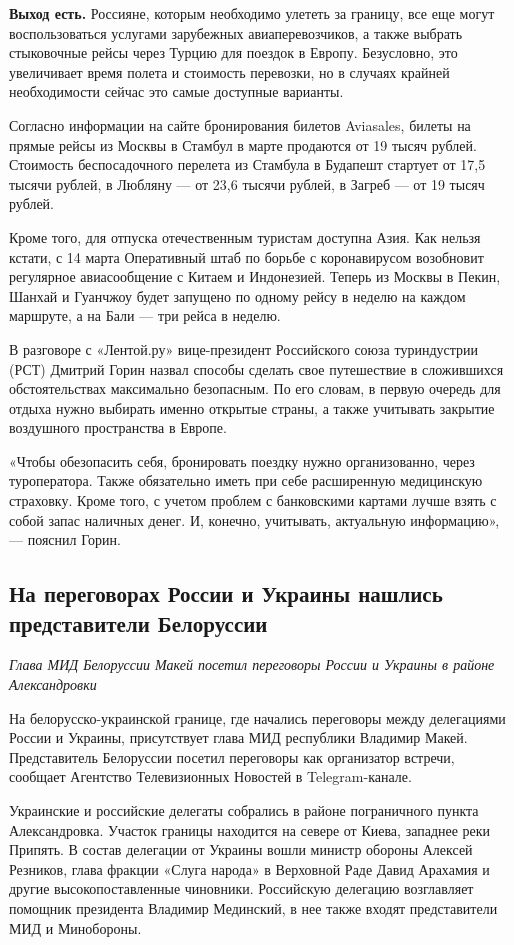 \textbf{Выход есть.} Россияне, которым необходимо улететь за границу, все еще могут воспользоваться услугами зарубежных авиаперевозчиков, а также выбрать стыковочные рейсы через Турцию для поездок в Европу. Безусловно, это увеличивает время полета и стоимость перевозки, но в случаях крайней необходимости сейчас это самые доступные варианты.

Согласно информации на сайте бронирования билетов Aviasales, билеты на прямые рейсы из Москвы в Стамбул в марте продаются от 19 тысяч рублей. Стоимость беспосадочного перелета из Стамбула в Будапешт стартует от 17,5 тысячи рублей, в Любляну --- от 23,6 тысячи рублей, в Загреб --- от 19 тысяч рублей.

Кроме того, для отпуска отечественным туристам доступна Азия. Как нельзя кстати, с 14 марта Оперативный штаб по борьбе с коронавирусом возобновит регулярное авиасообщение с Китаем и Индонезией. Теперь из Москвы в Пекин, Шанхай и Гуанчжоу будет запущено по одному рейсу в неделю на каждом маршруте, а на Бали --- три рейса в неделю.

В разговоре с «Лентой.ру» вице-президент Российского союза туриндустрии (РСТ) Дмитрий Горин назвал способы сделать свое путешествие в сложившихся обстоятельствах максимально безопасным. По его словам, в первую очередь для отдыха нужно выбирать именно открытые страны, а также учитывать закрытие воздушного пространства в Европе.

«Чтобы обезопасить себя, бронировать поездку нужно организованно, через туроператора. Также обязательно иметь при себе расширенную медицинскую страховку. Кроме того, с учетом проблем с банковскими картами лучше взять с собой запас наличных денег. И, конечно, учитывать, актуальную информацию», --- пояснил Горин.


\subsection{На переговорах России и Украины нашлись представители Белоруссии}
\textit{Глава МИД Белоруссии Макей посетил переговоры России и Украины в районе Александровки}

На белорусско-украинской границе, где начались переговоры между делегациями России и Украины, присутствует глава МИД республики Владимир Макей. Представитель Белоруссии посетил переговоры как организатор встречи, сообщает Агентство Телевизионных Новостей в Telegram-канале.

Украинские и российские делегаты собрались в районе пограничного пункта Александровка. Участок границы находится на севере от Киева, западнее реки Припять. В состав делегации от Украины вошли министр обороны Алексей Резников, глава фракции «Слуга народа» в Верховной Раде Давид Арахамия и другие высокопоставленные чиновники. Российскую делегацию возглавляет помощник президента Владимир Мединский, в нее также входят представители МИД и Минобороны.

